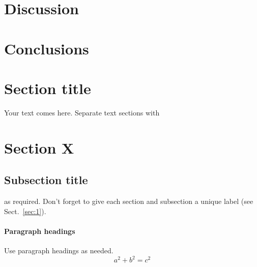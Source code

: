 \section{Discussion}
\label{sec:6}
\section{Conclusions}
\label{sec:7}


\section{Section title}
\label{sec:10}
Your text comes here. Separate text sections with
\section{Section X}
\label{sec:x}
\subsection{Subsection title}
\label{sec:20}
as required. Don't forget to give each section 
and subsection a unique label (see Sect.~\ref{sec:1}).
\paragraph{Paragraph headings} Use paragraph headings as needed.
\begin{equation}
a^2+b^2=c^2
\end{equation}

